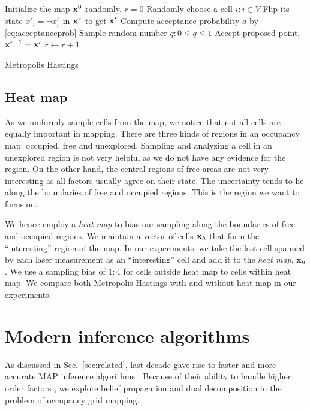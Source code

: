 \documentclass[letterpaper, 10 pt, conference]{ieeeconf} %
\begin{document}
% 
\begin{algorithm}
  Initialize the map $\mathbf{x}^0$ randomly.\;
  $r = 0$\;
   {
    Randomly choose a cell $i : i \in V$\;
    Flip its state $x'_i = \neg x^r_i$ in $\mathbf{x}^r$ to get $\mathbf{x}'$\;
    Compute acceptance probability $a$ by \eqref{eq:acceptanceprob}\;
    Sample random number $q : 0 \le q \le 1$\;
     {
      Accept proposed point, $\mathbf{x}^{r + 1} = \mathbf{x}'$\;
    } 
    $r \leftarrow r + 1$\;
  }
  \caption{Metropolis Hastings}
  \label{alg:metropolis}
\end{algorithm}

\subsection{Heat map}
As we uniformly sample cells from the map, we notice that not all
cells are equally important in mapping. There are three kinds of regions in an 
occupancy map: occupied, free and unexplored. Sampling and analyzing a cell in 
an
unexplored region is not very helpful as we do not have any evidence for the
region. On the other hand, the central regions of free areas are not very
interesting as all factors usually agree on their state. The uncertainty tends 
to lie
along the boundaries of free and occupied regions. This is the
region we want to focus on.

We hence employ a \emph{heat map} to bias our sampling along the boundaries of free
and occupied regions. We maintain a vector of cells $\mathbf{x}_h$ that form the
``interesting'' region of the map. In our experiments, we take the last cell
spanned by each laser measurement as an ``interesting'' cell and add it to the
\emph{heat map}, $\mathbf{x}_h$. We use a sampling bias of $1:4$ for cells
outside heat map to cells within heat map. We compare both Metropolis Hastings
with and without heat map in our experiments.

\section{Modern inference algorithms}
As discussed in Sec.~\ref{sec:related}, last decade gave rise to faster and
more accurate MAP inference algorithms \cite{kappes2013comparative}. Because of
their ability to handle higher order factors
\cite{potetz2007efficient,komodakis2009beyond}, we explore belief propagation
and dual decomposition in the problem of occupancy grid mapping.
\end{document}

